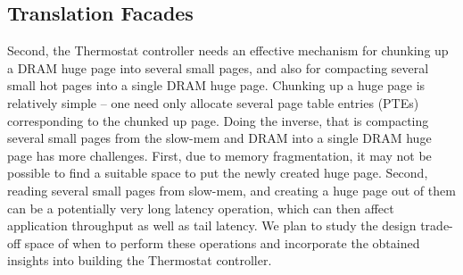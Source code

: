 \subsection{Translation Facades}

%
Second, the Thermostat controller needs an effective mechanism for chunking up a DRAM
huge page into several small pages, and also for compacting several small hot
pages into a single DRAM huge page. Chunking up a huge page is relatively simple
-- one need only allocate several page table entries (PTEs) corresponding to the
chunked up page. Doing the inverse, that is compacting several small pages from
the slow-mem and DRAM into a single DRAM huge page has more challenges. First,
due to memory fragmentation, it may not be possible to find a suitable space to
put the newly created huge page. Second, reading several small pages from
slow-mem, and creating a huge page out of them can be a potentially very long
latency operation, which can then affect application throughput as well as tail
latency. We plan to study the design trade-off space of when to perform
these operations and incorporate the obtained insights into building the Thermostat
controller.
